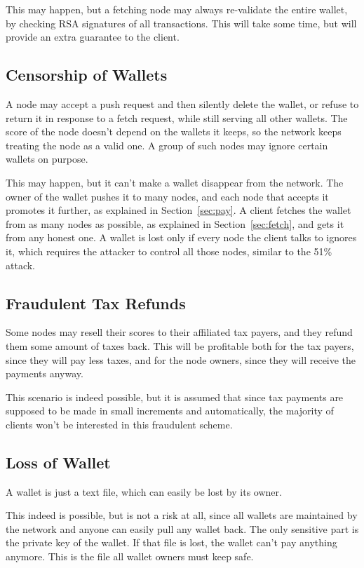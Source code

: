 \documentclass{main}
\begin{document}
This may happen, but a fetching node may always re-validate the entire wallet,
by checking RSA signatures of all transactions. This will take some time, but will
provide an extra guarantee to the client.

\subsection{Censorship of Wallets}

A node may accept a push request and then silently delete the wallet,
or refuse to return it in response to a fetch request, while still
serving all other wallets. The score of the node doesn't depend on
the wallets it keeps, so the network keeps treating the node as a valid one.
A group of such nodes may ignore certain wallets on purpose.

This may happen, but it can't make a wallet disappear from the network.
The owner of the wallet pushes it to many nodes, and each node that accepts
it promotes it further, as explained in Section~\ref{sec:pay}.
A client fetches the wallet from as many nodes as possible,
as explained in Section~\ref{sec:fetch}, and gets it from any honest one.
A wallet is lost only if every node the client talks to ignores it,
which requires the attacker to control all those nodes, similar to the 51\% attack.

\subsection{Fraudulent Tax Refunds}

Some nodes may resell their scores to their affiliated tax payers, and they
refund them some amount of taxes back. This will be profitable both for
the tax payers, since they will pay less taxes, and for the node owners,
since they will receive the payments anyway.

This scenario is indeed possible, but it is assumed that since tax payments are
supposed to be made in small increments and automatically, the majority of
clients won't be interested in this fraudulent scheme.

\subsection{Loss of Wallet}

A wallet is just a text file, which can easily be lost by its owner.

This indeed is possible, but is not a risk at all, since all wallets are
maintained by the network and anyone can easily pull any wallet back.
The only sensitive part is the private key of the wallet. If that file
is lost, the wallet can't pay anything anymore. This is the file all
wallet owners must keep safe.
\end{document}
